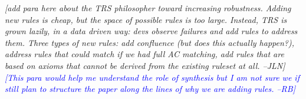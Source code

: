 \documentclass[acmsmall,review]{acmart}\settopmatter{printfolios=true,printccs=false,printacmref=false}
\newcommand{\jln}[1]{\textcolor{uwpurple}{\textit{[{#1} --JLN]}}}
\newcommand{\rb}[1]{\textcolor{blue}{\textit{[{#1} --RB]}}}
\newcommand{\rewrites}[0]{\:\rightarrow_{R}\:}
\begin{document}

\jln{add para here about the TRS philosopher toward increasing robustness. Adding new rules 
is cheap, but the space of possible rules is too large. Instead, TRS is grown lazily,
in a data driven way: 
devs observe failures and add rules to address them. Three types of new rules: add confluence 
(but does this actually happen?), address rules that could match if we had full AC 
matching, add rules that are based on axioms that cannot be derived from the existing 
ruleset at all.}
\rb{This para would help me understand the role of synthesis but I am not sure we if still plan to structure the paper along the lines of why we are adding rules. }
\end{document}
